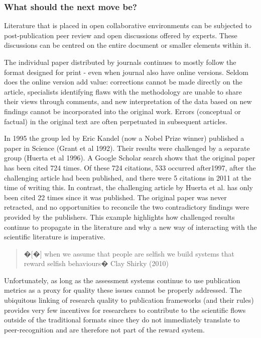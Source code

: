 \documentclass[final,authoryear,3p]{elsarticle-open-drafting}
\begin{document}
\subsubsection{What should the next move be?}

Literature that is placed in open collaborative environments can be subjected to post-publication peer review and open 
discussions offered by experts. These discussions can be centred on the entire document or smaller elements within it. 

The individual paper distributed by journals continues to mostly follow the format designed for print - even when journal also 
have online versions. Seldom does the online version add value: corrections cannot be made directly on the article, specialists 
identifying flaws with the methodology are unable to share their views through comments, and new interpretation of the data 
based on new findings cannot be incorporated into the original work. Errors (conceptual or factual) in the original text are often 
perpetuated in subsequent articles.

In 1995 the group led by Eric Kandel (now a Nobel Prize winner) published a paper in Science (Grant et al 1992). Their results 
were challenged by a separate group (Huerta et al 1996). A Google Scholar search shows that the original paper has been cited 
724 times. Of these 724 citations, 533 occurred after1997, after the challenging article had been published, and there were 5 
citations in 2011 at the time of writing this. In contrast, the challenging article by Huerta et al. has only been cited 22 times since it 
was published. The original paper was never retracted, and no opportunities to reconcile the two contradictory findings were 
provided by the publishers. This example highlights how challenged results continue to propagate in the literature and why a 
new way of interacting with the scientific literature is imperative. 

\begin{quote}
�[�] when we assume that people are selfish we build systems that reward selfish behaviours� Clay Shirky (2010)
\end{quote}

Unfortunately, as long as the assessment systems continue to use publication metrics as a proxy for quality these issues cannot be properly addressed. The ubiquitous linking of research quality to publication frameworks (and their rules) provides very few incentives for researchers to contribute to the scientific flows outside of the traditional formats since they do not immediately translate to peer-recognition and are therefore not part of the reward system. 
\end{document}
